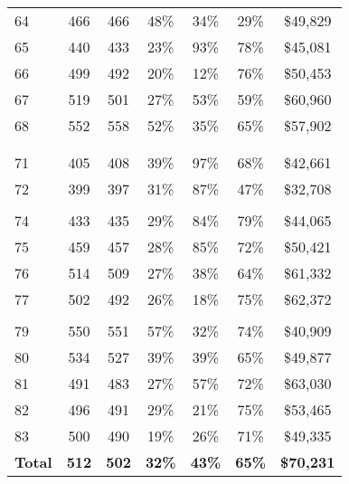 \documentclass[
  12pt,
]{article}
\begin{document}
\begin{table}
{\begin{tabular}{>{}l>{}c>{}c>{}c>{}c>{}c>{}c}
64 & 466 & 466 & 48\% & 34\% & 29\% & \$49,829\\
65 & 440 & 433 & 23\% & 93\% & 78\% & \$45,081\\
66 & 499 & 492 & 20\% & 12\% & 76\% & \$50,453\\
67 & 519 & 501 & 27\% & 53\% & 59\% & \$60,960\\
68 & 552 & 558 & 52\% & 35\% & 65\% & \$57,902\\
\cellcolor[HTML]{b9efe6}{69} & \cellcolor[HTML]{b9efe6}{534} & \cellcolor[HTML]{b9efe6}{521} & \cellcolor[HTML]{b9efe6}{37\%} & \cellcolor[HTML]{b9efe6}{19\%} & \cellcolor[HTML]{b9efe6}{65\%} & \cellcolor[HTML]{b9efe6}{\$88,100}\\
\cellcolor[HTML]{b9efe6}{70} & \cellcolor[HTML]{b9efe6}{613} & \cellcolor[HTML]{b9efe6}{598} & \cellcolor[HTML]{b9efe6}{65\%} & \cellcolor[HTML]{b9efe6}{29\%} & \cellcolor[HTML]{b9efe6}{61\%} & \cellcolor[HTML]{b9efe6}{\$86,381}\\
71 & 405 & 408 & 39\% & 97\% & 68\% & \$42,661\\
72 & 399 & 397 & 31\% & 87\% & 47\% & \$32,708\\
\cellcolor[HTML]{b9efe6}{73} & \cellcolor[HTML]{b9efe6}{528} & \cellcolor[HTML]{b9efe6}{514} & \cellcolor[HTML]{b9efe6}{29\%} & \cellcolor[HTML]{b9efe6}{42\%} & \cellcolor[HTML]{b9efe6}{62\%} & \cellcolor[HTML]{b9efe6}{\$90,849}\\
74 & 433 & 435 & 29\% & 84\% & 79\% & \$44,065\\
75 & 459 & 457 & 28\% & 85\% & 72\% & \$50,421\\
76 & 514 & 509 & 27\% & 38\% & 64\% & \$61,332\\
77 & 502 & 492 & 26\% & 18\% & 75\% & \$62,372\\
\cellcolor[HTML]{b9efe6}{78} & \cellcolor[HTML]{b9efe6}{594} & \cellcolor[HTML]{b9efe6}{578} & \cellcolor[HTML]{b9efe6}{56\%} & \cellcolor[HTML]{b9efe6}{26\%} & \cellcolor[HTML]{b9efe6}{39\%} & \cellcolor[HTML]{b9efe6}{\$134,400}\\
79 & 550 & 551 & 57\% & 32\% & 74\% & \$40,909\\
80 & 534 & 527 & 39\% & 39\% & 65\% & \$49,877\\
81 & 491 & 483 & 27\% & 57\% & 72\% & \$63,030\\
82 & 496 & 491 & 29\% & 21\% & 75\% & \$53,465\\
83 & 500 & 490 & 19\% & 26\% & 71\% & \$49,335\\
\addlinespace
\textbf{Total} & \textbf{512} & \textbf{502} & \textbf{32\%} & \textbf{43\%} & \textbf{65\%} & \textbf{\$70,231}\\
\bottomrule
\end{tabular}}
\end{table}
\begingroup
\fontsize{10}{10}\selectfont
\end{document}
